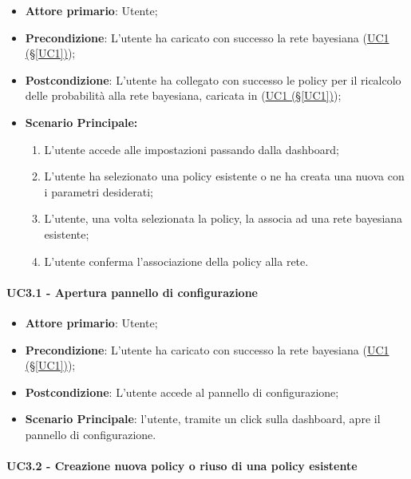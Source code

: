 \begin{itemize}
	\item \textbf{Attore primario}: Utente; 
	\item \textbf{Precondizione}: L'utente ha caricato con successo la rete bayesiana (\hyperref[UC1]{UC1 (§\ref*{UC1})});
	\item \textbf{Postcondizione}: L'utente ha collegato con successo le policy per il ricalcolo delle probabilità alla rete bayesiana, caricata in (\hyperref[UC1]{UC1 (§\ref*{UC1})});	
	\item \textbf{Scenario Principale:}

	\begin{enumerate}
		\item L'utente accede alle impostazioni passando dalla dashboard;
		\item L'utente ha selezionato una policy esistente o ne ha creata una nuova con i parametri desiderati; 
		\item L'utente, una volta selezionata la policy, la associa  ad una rete bayesiana esistente;
		\item L'utente conferma l'associazione della policy alla rete.
	\end{enumerate}
	
\end{itemize}

\paragraph{UC3.1 - Apertura pannello di configurazione}\label{UC3.1}
\begin{itemize}
	\item \textbf{Attore primario}: Utente; 
	\item \textbf{Precondizione}: L'utente ha caricato con successo la rete bayesiana (\hyperref[UC1]{UC1 (§\ref*{UC1})});
	\item \textbf{Postcondizione}: L'utente accede al pannello di configurazione;
	\item \textbf{Scenario Principale}: l'utente, tramite un click sulla dashboard, apre il pannello di configurazione. 
\end{itemize}

\paragraph{UC3.2 - Creazione nuova policy o riuso di una policy esistente}\label{UC3.2}


